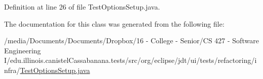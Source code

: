 Definition at line 26 of file TestOptionsSetup.java.



The documentation for this class was generated from the following file:\begin{DoxyCompactItemize}
\item 
/media/Documents/Documents/Dropbox/16 -\/ College -\/ Senior/CS 427 -\/ Software Engineering I/edu.illinois.canistelCassabanana.tests/src/org/eclipse/jdt/ui/tests/refactoring/infra/\hyperlink{TestOptionsSetup_8java}{TestOptionsSetup.java}\end{DoxyCompactItemize}
